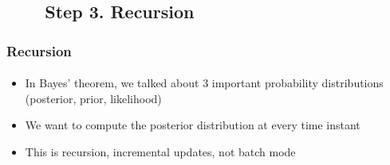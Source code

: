 






\subsection{\ \ \ \ Step 3. Recursion}
\begin{frame}
\frametitle{Recursion}
\framesubtitle{}
\mypagenum
\begin{itemize}
\item In Bayes' theorem, we talked about 3 important probability distributions (posterior, prior, likelihood)
\item We want to compute the posterior distribution at every time instant
\item This is recursion, incremental updates, not batch mode
\end{itemize}
\end{frame}




